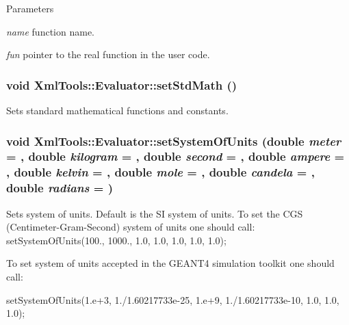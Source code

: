 \begin{DoxyParams}{Parameters}
\item[{\em name}]function name. \item[{\em fun}]pointer to the real function in the user code. \end{DoxyParams}
\hypertarget{class_xml_tools_1_1_evaluator_a5df1e3d20d6e6d9150378544d95e86b6}{
\subsubsection[{setStdMath}]{\setlength{\rightskip}{0pt plus 5cm}void XmlTools::Evaluator::setStdMath ()}}
\label{class_xml_tools_1_1_evaluator_a5df1e3d20d6e6d9150378544d95e86b6}
Sets standard mathematical functions and constants. \hypertarget{class_xml_tools_1_1_evaluator_a94fce6a14158fd1e9af0135268f0f68b}{
\subsubsection[{setSystemOfUnits}]{\setlength{\rightskip}{0pt plus 5cm}void XmlTools::Evaluator::setSystemOfUnits (double {\em meter} = {}, \/  double {\em kilogram} = {}, \/  double {\em second} = {}, \/  double {\em ampere} = {}, \/  double {\em kelvin} = {}, \/  double {\em mole} = {}, \/  double {\em candela} = {}, \/  double {\em radians} = {})}}
\label{class_xml_tools_1_1_evaluator_a94fce6a14158fd1e9af0135268f0f68b}
Sets system of units. Default is the SI system of units. To set the CGS (Centimeter-\/Gram-\/Second) system of units one should call: setSystemOfUnits(100., 1000., 1.0, 1.0, 1.0, 1.0, 1.0);

To set system of units accepted in the GEANT4 simulation toolkit one should call: 
\begin{DoxyCode}
   setSystemOfUnits(1.e+3, 1./1.60217733e-25, 1.e+9, 1./1.60217733e-10,
                    1.0, 1.0, 1.0);
\end{DoxyCode}


